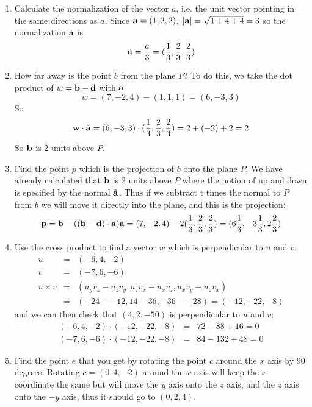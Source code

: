 \documentclass{book}
\newcommand{\vect}[1]{{\bf{ #1}}}
\begin{document}
\begin{enumerate}
\item Calculate the normalization of the vector $a$, i.e. the unit vector pointing in the same directions as $a$.
\newline
Since ${\vect{a}} = (1,2,2)$, $\vert \vect{a} \vert = \sqrt{1+4+4} = 3$ so the normalization $\tilde{\vect{a}}$ is
\[
\tilde{\vect{a}} = \frac{a}{3} = (\frac{1}{3},\frac{2}{3},\frac{2}{3})
\]
\item How far away is the point $b$ from the plane $P$?
\newline
To do this, we take the dot product of $w = \vect {b} - \vect {d}$ with $\tilde{\vect{a}}$
\[
w = (7,-2,4) - (1,1,1) = (6,-3,3)
\]
So
\[
\vect{w} \cdot \tilde{\vect{a}} = (6,-3,3) \cdot  (\frac{1}{3},\frac{2}{3},\frac{2}{3}) =
2 + (-2) + 2 = 2
\]
So $\vect{b}$ is 2 units above $P$.
\item Find the point $p$ which is the projection of $b$ onto the plane $P$.
\newline
We have already calculated that $\vect b$ is 2 units above $P$ where the notion of up
and down is specified by the normal $\tilde \vect a$.
Thus if we subtract t times the normal to $P$ from $b$ we will move it directly into the
plane, and this is the projection:
\[
\vect p = \vect b - ((\vect b - \vect d) \cdot \tilde \vect a) \tilde \vect a = (7,-2,4) - 2 (\frac{1}{3},\frac{2}{3},\frac{2}{3})
= (6\frac{1}{3}, -3\frac{1}{3},2\frac{2}{3})
\]

\item Use the cross product to find a vector $w$ which is perpendicular to $u$ and $v$.
\newline
\begin{eqnarray*}
u &=& (-6, 4, -2) \\
v &=& ( -7, 6, -6) \\
u\times v &=& (u_yv_z-u_zv_y, u_zv_x-u_xv_z, u_xv_y-u_zv_x) \\
&=& (-24--12, 14-36,-36--28) = (-12,-22,-8)
\end{eqnarray*}
and we can then check that $(4,2,-50)$ is perpendicular to $u$ and $v$:
\begin{eqnarray*}
(-6,4,-2) \cdot (-12,-22,-8) &=& 72 - 88 +16 = 0 \\
(-7,6,-6) \cdot (-12,-22,-8) &=& 84 -132 + 48 = 0
\end{eqnarray*}
\item Find the point $e$ that you get by rotating the point $c$ around the $x$ axis by 90 degrees.
\newline
Rotating $c = (0,4,-2)$ around the $x$ axis will keep the $x$ coordinate the same but will move the $y$ axis
onto the $z$ axis, and the $z$ axis onto the $-y$ axis, thus it should go to $(0, 2, 4)$.
\end{enumerate}
\end{document}
